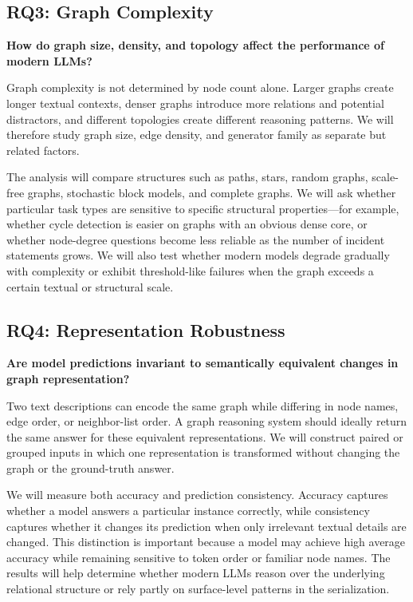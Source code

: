\documentclass[11pt,a4paper]{article}
\begin{document}
\subsection{RQ3: Graph Complexity}

\textbf{How do graph size, density, and topology affect the performance of modern LLMs?}

Graph complexity is not determined by node count alone. Larger graphs create longer textual contexts, denser graphs introduce more relations and potential distractors, and different topologies create different reasoning patterns. We will therefore study graph size, edge density, and generator family as separate but related factors.

The analysis will compare structures such as paths, stars, random graphs, scale-free graphs, stochastic block models, and complete graphs. We will ask whether particular task types are sensitive to specific structural properties—for example, whether cycle detection is easier on graphs with an obvious dense core, or whether node-degree questions become less reliable as the number of incident statements grows. We will also test whether modern models degrade gradually with complexity or exhibit threshold-like failures when the graph exceeds a certain textual or structural scale.

\subsection{RQ4: Representation Robustness}

\textbf{Are model predictions invariant to semantically equivalent changes in graph representation?}

Two text descriptions can encode the same graph while differing in node names, edge order, or neighbor-list order. A graph reasoning system should ideally return the same answer for these equivalent representations. We will construct paired or grouped inputs in which one representation is transformed without changing the graph or the ground-truth answer.

We will measure both accuracy and prediction consistency. Accuracy captures whether a model answers a particular instance correctly, while consistency captures whether it changes its prediction when only irrelevant textual details are changed. This distinction is important because a model may achieve high average accuracy while remaining sensitive to token order or familiar node names. The results will help determine whether modern LLMs reason over the underlying relational structure or rely partly on surface-level patterns in the serialization.
\end{document}
